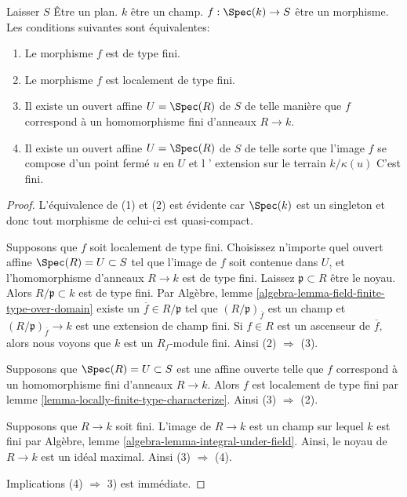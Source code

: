 \begin{lemma}

\label{lemma-point-finite-type}

Laisser $S$ Être un plan. $k$ être un champ. $f : \Spec(k) \to S$ être un morphisme. Les conditions suivantes sont équivalentes:

\begin{enumerate}

\item Le morphisme $f$ est de type fini.
\item Le morphisme $f$ est localement de type fini.
\item Il existe un ouvert affine $U = \Spec(R)$ de $S$
de telle manière que $f$ correspond à un homomorphisme fini d'anneaux $R \to k$.
\item Il existe un ouvert affine $U = \Spec(R)$ de $S$
de telle sorte que l'image $f$ se compose d'un point fermé $u$ en $U$
et l ' extension sur le terrain $k/\kappa(u)$ C'est fini.

\end{enumerate}

\end{lemma}

\begin{proof}
L'équivalence de (1) et (2) est évidente car $\Spec(k)$ est un singleton et donc tout morphisme de celui-ci est quasi-compact.

\medskip\noindent
Supposons que $f$ soit localement de type fini. Choisissez n'importe quel ouvert affine $\Spec(R) = U \subset S$ tel que l'image de $f$ soit contenue dans $U$, et l'homomorphisme d'anneaux $R \to k$ est de type fini. Laissez $\mathfrak p \subset R$ être le noyau. Alors $R/\mathfrak p \subset k$ est de type fini. Par Algèbre, lemme \ref{algebra-lemma-field-finite-type-over-domain} existe un $\overline{f} \in R/\mathfrak p$ tel que $(R/\mathfrak p)_{\overline{f}}$ est un champ et $(R/\mathfrak p)_{\overline{f}} \to k$ est une extension de champ fini. Si $f \in R$ est un ascenseur de $\overline{f}$, alors nous voyons que $k$ est un $R_f$-module fini. Ainsi (2) $\Rightarrow$ (3).

\medskip\noindent
Supposons que $\Spec(R) = U \subset S$ est une affine ouverte telle que $f$ correspond à un homomorphisme fini d'anneaux $R \to k$. Alors $f$ est localement de type fini par lemme \ref{lemma-locally-finite-type-characterize}. Ainsi (3) $\Rightarrow$ (2).

\medskip\noindent
Supposons que $R \to k$ soit fini. L'image de $R \to k$ est un champ sur lequel $k$ est fini par Algèbre, lemme \ref{algebra-lemma-integral-under-field}. Ainsi, le noyau de $R \to k$ est un idéal maximal. Ainsi (3) $\Rightarrow$ (4).

\medskip\noindent

Implications (4) $\Rightarrow$ 3) est immédiate.

\end{proof}

